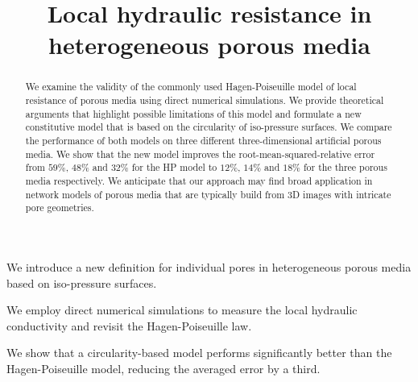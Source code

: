 \documentclass[draft]{agujournal2019}
\begin{document}
\title{Local hydraulic resistance in heterogeneous porous media}









\begin{keypoints}
\item We introduce a new definition for individual pores in heterogeneous porous media based on iso-pressure surfaces.
\item We employ direct numerical simulations to measure the local hydraulic conductivity and revisit the Hagen-Poiseuille law. 
\item We show that a circularity-based model performs significantly better than the Hagen-Poiseuille model, reducing the averaged error by a third.
\end{keypoints}


\begin{abstract}
We examine the validity of the commonly used Hagen-Poiseuille model of local resistance of porous media using direct numerical simulations. We provide theoretical arguments that highlight possible limitations of this model and formulate a new constitutive model that is based on the circularity of iso-pressure surfaces. We compare the performance of both models on three different three-dimensional artificial porous media. We show that the new model improves the root-mean-squared-relative error from $59\%$, $48\%$ and $32\%$ for the HP model to $12\%$, $14\%$ and $18\%$ for the three porous media respectively. We anticipate that our approach may find broad application in network models of porous media that are typically build from 3D images with intricate pore geometries.
\end{abstract}
\end{document}
